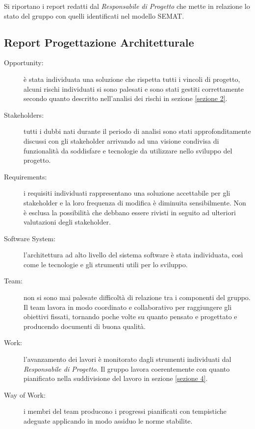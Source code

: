 Si riportano i report redatti dal \textit{Responsabile di Progetto} che mette in relazione lo stato del gruppo con quelli identificati nel modello \gls{SEMAT}.

\subsection{Report Progettazione Architetturale}
\begin{description}
	\item[Opportunity:] è stata individuata una soluzione che rispetta tutti i vincoli di progetto, alcuni rischi individuati si sono palesati e sono stati gestiti correttamente secondo quanto descritto nell'analisi dei rischi in sezione \ref{sezione 2}.
	\item[Stakeholders:] tutti i dubbi nati durante il periodo di analisi sono stati approfonditamente discussi con gli stakeholder arrivando ad una visione condivisa di funzionalità da soddisfare e tecnologie da utilizzare nello sviluppo del progetto.
	\item[Requirements:] i requisiti individuati rappresentano una soluzione accettabile per gli stakeholder e la loro frequenza di modifica è diminuita sensibilmente. Non è esclusa la possibilità che debbano essere rivisti in seguito ad ulteriori valutazioni degli stakeholder. 
	\item[Software System:] l'architettura ad alto livello del sistema software è stata individuata, così come le tecnologie e gli strumenti utili per lo sviluppo.
	\item[Team:] non si sono mai palesate difficoltà di relazione tra i componenti del gruppo. Il team lavora in modo coordinato e collaborativo per raggiungere gli obiettivi fissati, tornando poche volte su quanto pensato e progettato e producendo documenti di buona qualità.
	\item[Work:] l'avanzamento dei lavori è monitorato dagli strumenti individuati dal \textit{Responsabile di Progetto}. Il gruppo lavora coerentemente con quanto pianificato nella suddivisione del lavoro in sezione \ref{sezione 4}.
	\item[Way of Work:] i membri del team producono i progressi pianificati con tempistiche adeguate applicando in modo assiduo le norme stabilite. 
\end{description}
